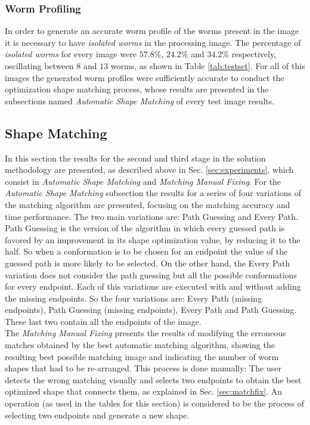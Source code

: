 \subsubsection*{Worm Profiling}

In order to generate an accurate worm profile of the worms present in the image
it is necessary to have \emph{isolated worms} in the processing image. The percentage 
of \emph{isolated worms} for every image were $57.8\%$, $24.2\%$ and $34.2\%$ 
respectively,
oscillating between $8$ and $13$ worms, as shown in Table \ref{tab:testset}. 
For all of this images the generated worm profiles were sufficiently accurate to
conduct the optimization shape matching process, whose results are presented in 
the subsections named \emph{Automatic Shape Matching} of every test image results.

\subsection{Shape Matching}

In this section the results for the second and third stage in the 
solution methodology are presented, as described above in Sec. \ref{sec:experiments}, which consist
in \emph{Automatic Shape Matching} and \emph{Matching Manual Fixing}. 
For the \emph{Automatic Shape Matching} subsection the results for a series of four 
variations of the matching algorithm are presented, focusing on the matching accuracy 
and time performance. The two main variations are: Path Guessing and Every Path. 
Path Guessing is the version of the algorithm in which every guessed path is favored
by an improvement in its shape optimization value, by reducing it to the half. So when 
a conformation is to be chosen for an endpoint the value of the guessed path is more likely
to be selected. On the other hand, the Every Path variation does not consider the 
path guessing but all the possible conformations for every endpoint.
Each of this variations are executed with and without adding the missing endpoints. So the
four variations are: Every Path (missing endpoints), Path Guessing (missing endpoints), 
Every Path and Path Guessing. These last two contain all the endpoints of the image.\\

The \emph{Matching Manual Fixing} presents the results of modifying the erroneous matches
obtained by the best automatic matching algorithm, showing the resulting best
possible matching image and indicating the number of worm shapes that had to be 
re-arranged. This process is done manually: The user detects the wrong matching visually 
and selects two endpoints to obtain the best optimized shape that connects them, as
explained in Sec. \ref{sec:matchfix}. An operation (as used in the tables for this section) 
is considered to be the process of selecting two endpoints and generate a new shape.\\

